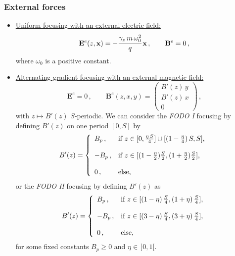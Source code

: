 \documentclass[10pt]{article}
\begin{document}
\subsubsection{External forces}

\begin{itemize}
\item \underline{Uniform focusing with an external electric field:}
\begin{equation}
\mathbf{E}^{e}(z,\mathbf{x}) = -\cfrac{\gamma_{z}\,m\,\omega_{0}^{2}}{q}\, \mathbf{x} \, , \qquad \mathbf{B}^{e} = 0 \, ,
\end{equation}
where $\omega_{0}$ is a positive constant.

\item \underline{Alternating gradient focusing with an external magnetic field:}
\begin{equation}
\mathbf{E}^{e} = 0 \, ,\qquad \mathbf{B}^{e}(z,x,y) = \left(
\begin{array}{c}
B'(z)\,y \\ B'(z)\,x \\ 0
\end{array}
\right) \, ,
\end{equation}
with $z \mapsto B'(z)$ $S$-periodic. We can consider the \textit{FODO I} focusing by defining $B'(z)$ on one period $[0,S]$ by
\begin{equation}
B'(z) = \left\{ 
\begin{array}{ll}
B_{p} \, , & \textnormal{if $z \in [0,\frac{\eta\,S}{4}] \cup [(1-\frac{\eta}{4})\,S,S]$,} \\ \\
-B_{p} \, , & \textnormal{if $z \in [(1-\frac{\eta}{2})\frac{S}{2}, (1+\frac{\eta}{2})\frac{S}{2}]$,} \\ \\
0 \, , & \textnormal{else,}
\end{array}
\right.
\end{equation}
or the \textit{FODO II} focusing by defining $B'(z)$ as
\begin{equation}
B'(z) = \left\{ 
\begin{array}{ll}
B_{p} \, , & \textnormal{if $z \in [(1-\eta)\,\frac{S}{4},(1+\eta)\,\frac{S}{4}]$,} \\ \\
-B_{p} \, , & \textnormal{if $z \in [(3-\eta)\,\frac{S}{4},(3+\eta)\,\frac{S}{4}]$,} \\ \\
0 \, , & \textnormal{else,}
\end{array}
\right.
\end{equation}
for some fixed constants $B_{p} \geq 0$ and $\eta \in \, ]0,1[$.



\end{itemize}
\end{document}
